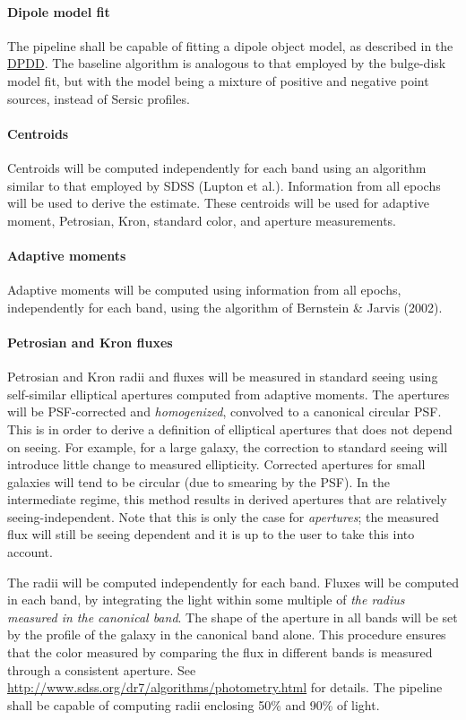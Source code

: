 \documentclass[12pt]{article}
\newcommand{\ds}[2]{{\color{blue} \href{https://docushare.lsstcorp.org/docushare/dsweb/Get/#1}{#2}}\xspace}
\newcommand{\DPDD}{\ds{LSE-163}{DPDD}}
\begin{document}
\paragraph{Dipole model fit}

The pipeline shall be capable of fitting a dipole object model, as described in the \DPDD. The baseline algorithm is analogous to that employed by the bulge-disk model fit, but with the model being a mixture of positive and negative point sources, instead of Sersic profiles.

\paragraph{Centroids} Centroids will be computed independently for each band using an algorithm similar to that employed by SDSS (Lupton et al.). Information from all epochs will be used to derive the estimate. These centroids will be used for adaptive moment, Petrosian, Kron, standard color, and aperture measurements.

\paragraph{Adaptive moments} Adaptive moments will be computed using information from all epochs, independently for each band, using the algorithm of Bernstein \& Jarvis (2002).

\paragraph{Petrosian and Kron fluxes} Petrosian and Kron radii and fluxes will be measured in standard seeing using self-similar elliptical apertures computed from adaptive moments. The apertures will be PSF-corrected and {\em homogenized}, convolved to a canonical circular PSF. This is in order to derive a definition of elliptical apertures that does not depend on seeing. For example, for a large galaxy, the correction to standard seeing will introduce little change to measured ellipticity. Corrected apertures for small galaxies will tend to be circular (due to smearing by the PSF). In the intermediate regime, this method results in derived apertures that are relatively seeing-independent. Note that this is only the case for {\em apertures}; the measured flux will still be seeing dependent and it is up to the user to take this into account.

The radii will be computed independently for each band. Fluxes will be computed in each band, by integrating the light within some multiple of {\em the radius measured in the canonical band}. The shape of the aperture in all bands will be set by the profile of the galaxy in the canonical band alone. This procedure ensures that the color measured by comparing the flux in different bands is measured through a consistent aperture. See \url{http://www.sdss.org/dr7/algorithms/photometry.html} for details. The pipeline shall be capable of computing radii enclosing 50\% and 90\% of light.
\end{document}
